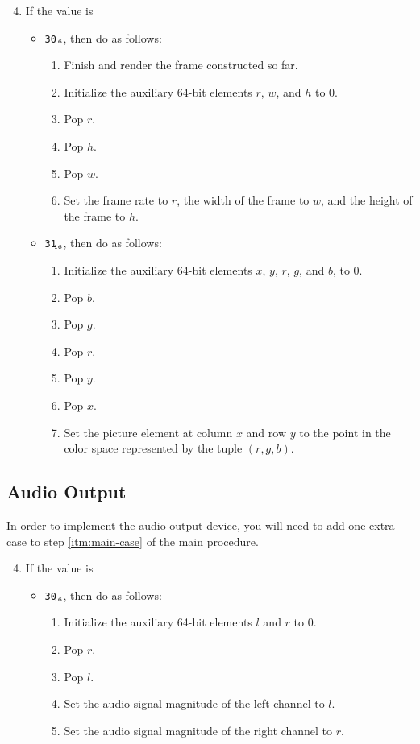 \documentclass[a4paper,12pt]{article}
\newcommand{\num}[1]{\texttt{#1}\xspace}
\newcommand{\hex}[1]{\num{#1}$_{\textup{\tiny\hskip-1ex 16}}$\xspace}
\newcommand{\op}[1]{#1}
\newcommand{\NEWFRAME}  [1]{\op{\hex{30}}}
\newcommand{\SETPIXEL}  [1]{\op{\hex{31}}}
\begin{document}
\begin{enumerate}
  \setcounter{enumi}{3}
\item If the value is
  \begin{itemize}
  \item \NEWFRAME{}, then do as follows:
    \begin{enumerate}
    \item Finish and render the frame constructed so far.
    \item Initialize the auxiliary 64-bit elements $r$, $w$, and $h$ to 0.
    \item Pop $r$.
    \item Pop $h$.
    \item Pop $w$.
    \item Set the frame rate to $r$, the width of the frame to $w$, and the height of the frame to $h$.
    \end{enumerate}
  \item \SETPIXEL{}, then do as follows:
    \begin{enumerate}
    \item Initialize the auxiliary 64-bit elements  $x$, $y$, $r$, $g$, and $b$, to 0.
    \item Pop $b$.
    \item Pop $g$.
    \item Pop $r$.
    \item Pop $y$.
    \item Pop $x$.
    \item Set the picture element at column $x$ and row $y$ to the point in the color space represented by the tuple $(r,g,b)$.
    \end{enumerate}
  \end{itemize}
\end{enumerate}

\subsection{Audio Output}

In order to implement the audio output device, you will need to add one extra case to step \ref{itm:main-case} of the main procedure.

\begin{enumerate}
  \setcounter{enumi}{3}
\item If the value is
  \begin{itemize}
  \item \NEWFRAME{}, then do as follows:
    \begin{enumerate}
    \item Initialize the auxiliary 64-bit elements  $l$ and $r$ to 0.
    \item Pop $r$.
    \item Pop $l$.
    \item Set the audio signal magnitude of the left channel to $l$.
    \item Set the audio signal magnitude of the right channel to $r$.
    \end{enumerate}
  \end{itemize}
\end{enumerate}
\end{document}
